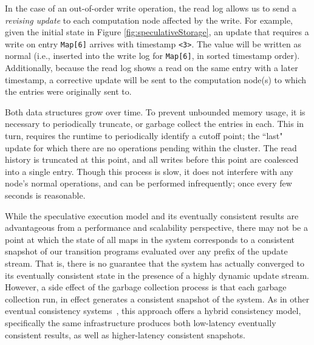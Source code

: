 In the case of an out-of-order write operation, the read log allows us to send a
\textit{revising update} to each computation node affected by the write.
For example, given the initial state in Figure \ref{fig:speculativeStorage}, an
update that requires a write on entry \texttt{Map[6]} arrives with timestamp
\texttt{<3>}.  The value will be written as normal (i.e., inserted into the
write log for \texttt{Map[6]}, in sorted timestamp order).  Additionally,
because the read log shows a read on the same entry with a later timestamp, a
corrective update will be sent to the computation node(s) to which the entries
were originally sent to.

Both data structures grow over time.  To prevent unbounded memory usage,
it is necessary to periodically truncate, or garbage collect the entries in each. 
This in turn, requires the runtime to periodically identify a cutoff point; the
``last" update for which there are no operations pending within the cluster. 
The read history is truncated at this point, and all writes before this point
are coalesced into a single entry.  Though this process is slow, it does not
interfere with any node's normal operations, and can be performed infrequently;
once every few seconds is reasonable.

While the speculative execution model and its eventually consistent results are
advantageous from a performance and scalability perspective, there may not be a
point at which the state of all maps in the system corresponds to a consistent
snapshot of our transition programs evaluated over any prefix of the update
stream.
That is, there is no guarantee that the system has actually converged to its
eventually consistent state in the presence of a highly dynamic update stream.
However, a side effect of the garbage collection process is that each garbage
collection run, in effect generates a consistent snapshot of the system. As in
other eventual consistency systems~\cite{bayou}, this approach offers a hybrid
consistency model, specifically the same infrastructure produces both
low-latency eventually consistent results, as well as higher-latency consistent
snapshots.

